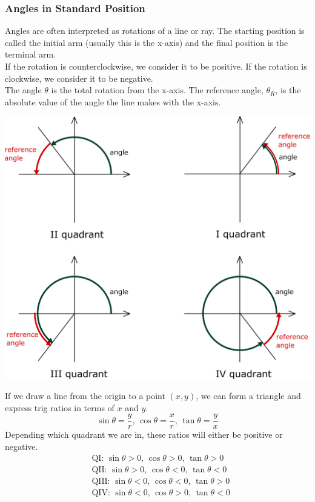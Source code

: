\documentclass[11pt, fleqn]{article}
\begin{document}
\subsubsection{Angles in Standard Position}
Angles are often interpreted as rotations of a line or ray. The starting position is called the initial arm (usually this is the x-axis) and the final position is the terminal arm.\\
If the rotation is counterclockwise, we consider it to be positive. If the rotation is clockwise, we consider it to be negative.\\
The angle $\theta$ is the total rotation from the x-axis. The reference angle, $\theta_R$, is the absolute value of the angle the line makes with the x-axis.\\
\centerline{\includegraphics[scale=0.13]{PreCalcPictures/ReferenceAngle.png}}
If we draw a line from the origin to a point $(x,y)$, we can form a triangle and express trig ratios in terms of $x$ and $y$.
$$\sin\theta=\frac{y}{r},\,\cos\theta=\frac{x}{r},\,\tan\theta=\frac{y}{x}$$
Depending which quadrant we are in, these ratios will either be positive or negative.
\begin{align*}
    &\mathrm{QI:}\,\sin\theta>0,\,\cos\theta>0,\,\tan\theta>0\\
    &\mathrm{QII:}\,\sin\theta>0,\,\cos\theta<0,\,\tan\theta<0\\
    &\mathrm{QIII:}\,\sin\theta<0,\,\cos\theta<0,\,\tan\theta>0\\
    &\mathrm{QIV:}\,\sin\theta<0,\,\cos\theta>0,\,\tan\theta<0
\end{align*}
\end{document}
